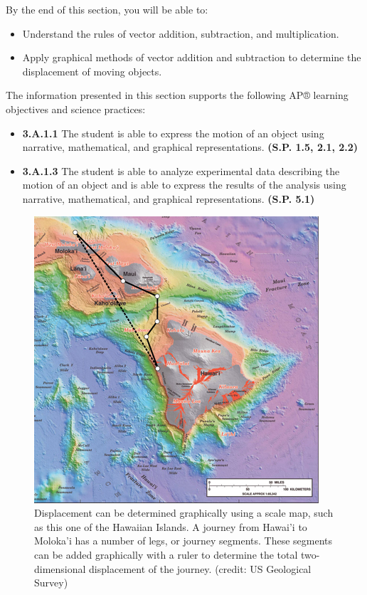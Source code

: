 \documentclass[
]{book}
\providecommand{\tightlist}{%
  \setlength{\itemsep}{0pt}\setlength{\parskip}{0pt}}
\begin{document}
By the end of this section, you will be able to:

\begin{itemize}
\tightlist
\item
  Understand the rules of vector addition, subtraction, and
  multiplication.
\item
  Apply graphical methods of vector addition and subtraction to
  determine the displacement of moving objects.
\end{itemize}

The information presented in this section supports the following AP®
learning objectives and science practices:

\begin{itemize}
\tightlist
\item
  \textbf{3.A.1.1} The student is able to express the motion of an object
  using narrative, mathematical, and graphical representations.
  \textbf{(S.P. 1.5, 2.1, 2.2)}
\item
  \textbf{3.A.1.3} The student is able to analyze experimental data
  describing the motion of an object and is able to express the
  results of the analysis using narrative, mathematical, and graphical
  representations. \textbf{(S.P. 5.1)}
\end{itemize}

\begin{figure}
\hypertarget{import-auto-id1165296227310}{%
\centering
\includegraphics{images/Figure_03_02_00a.jpg}
\caption{Displacement can be determined graphically using a scale map, such as
this one of the Hawaiian Islands. A journey from Hawai'i to Moloka'i
has a number of legs, or journey segments. These segments can be added
graphically with a ruler to determine the total two-dimensional
displacement of the journey. (credit: US Geological
Survey)}\label{import-auto-id1165296227310}
}
\end{figure}
\end{document}
